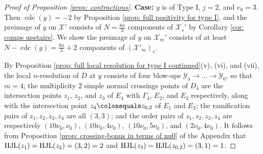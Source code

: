\documentclass[12pt]{amsart}
\numberwithin{equation}{section}
\theoremstyle{definition}
\newcommand{\X}{\mathcal{X}}
\newcommand{\Y}{\mathcal{Y}}
\newcommand{\tx}[1]{\text{#1}}
\let\L\relax
\DeclareMathOperator{\cdc}{cdc}
\DeclareMathOperator{\HJL}{HJL}
\DeclareMathOperator{\L}{L}
\begin{document}
\begin{proof}[Proof of Proposition \ref{prop: contractions}]
    
    \textbf{Case:} $y$ is of Type I, $j=2$, and $e_0=3$. Then $\cdc(y)=-2$ by Proposition \ref{prop: full positivity for type I}, and the preimage of $y$ on $\X'$ consists of $N=\frac{8n}{3}$ components of $\X_s'$ by Corollary \ref{cor: comps upstairs}. We show the preimage of $y$ on $\X_m'$ consists of at least $N-\cdc(y)=\frac{8n}{3}+2$ components of $(\X'_m)_s$.

    By Proposition \ref{prop: full local resolution for type I continued}(v), (vi), and (vii), the local $n$-resolution of $D$ at $y$ consists of four blow-ups $\Y_4\to...\to\Y_0$, so that $m=4$; the multiplicity $2$ simple normal crossings points of $D_4$ are the intersection points $z_1$, $z_2$, and $z_3$ of $E_4$ with $\Gamma_4$, $E_2$, and $E_3$ respectively, along with the intersection point $z_4\colonequals z_{0,2}$ of $E_1$ and $E_2$; the ramification pairs of $z_1,z_2,z_3,z_4$ are all $(3,3)$; and the order pairs of $z_1,z_2,z_3,z_4$ are respectively $(10\nu_0,\nu_0)$, $(10\nu_0,4\nu_0)$, $(10\nu_0,5\nu_0)$, and $(2\nu_0,4\nu_0)$. It follows from Proposition \ref{prop: crossing-bonus in terms of nu0} of the Appendix that $\HJL(z_1)=\HJL(z_2)=\L(3,2)=2$ and $\HJL(z_3)=\HJL(z_{0,2})=\L(3,1)=1$.


\end{proof}
\end{document}
